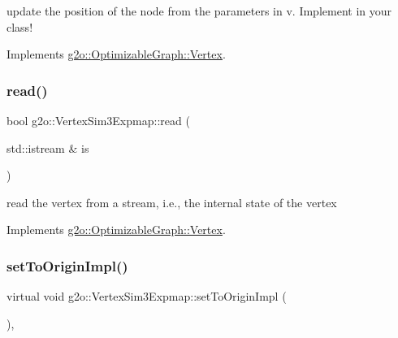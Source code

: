 update the position of the node from the parameters in v. Implement in your class! 

Implements \mbox{\hyperlink{classg2o_1_1_optimizable_graph_1_1_vertex_a4537a46afb8d12c3f18c88ba9601c625}{g2o\+::\+Optimizable\+Graph\+::\+Vertex}}.

\mbox{\label{classg2o_1_1_vertex_sim3_expmap_a16b4ef216ad1c4709a6fc6aa452d8e61}} 
\subsubsection{\texorpdfstring{read()}{read()}}
{\footnotesize\ttfamily bool g2o\+::\+Vertex\+Sim3\+Expmap\+::read (\begin{DoxyParamCaption}\item[{std\+::istream \&}]{is }\end{DoxyParamCaption})\hspace{0.3cm}{\ttfamily [virtual]}}



read the vertex from a stream, i.\+e., the internal state of the vertex 



Implements \mbox{\hyperlink{classg2o_1_1_optimizable_graph_1_1_vertex_a356c40d33c3f1e07afa938dfb4870230}{g2o\+::\+Optimizable\+Graph\+::\+Vertex}}.

\mbox{\label{classg2o_1_1_vertex_sim3_expmap_ab076d5964ab55f95251a75bcf341ce05}} 
\subsubsection{\texorpdfstring{set\+To\+Origin\+Impl()}{setToOriginImpl()}}
{\footnotesize\ttfamily virtual void g2o\+::\+Vertex\+Sim3\+Expmap\+::set\+To\+Origin\+Impl (\begin{DoxyParamCaption}{ }\end{DoxyParamCaption})\hspace{0.3cm}{\ttfamily [inline]}, {\ttfamily [virtual]}}



